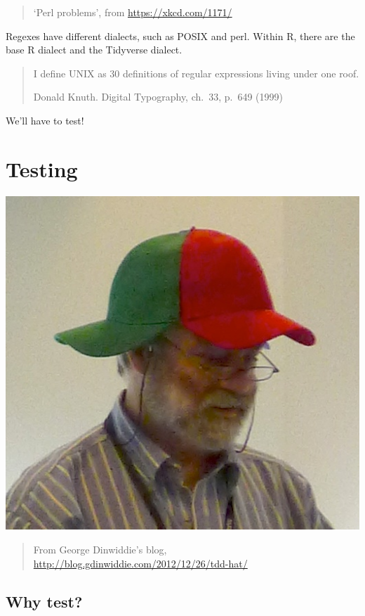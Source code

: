\documentclass[]{book}
\begin{document}
\begin{quote}
`Perl problems', from \url{https://xkcd.com/1171/}
\end{quote}

Regexes have different dialects, such as POSIX and perl.
Within R, there are the base R dialect and the Tidyverse dialect.

\begin{quote}
I define UNIX as 30 definitions of regular expressions living under one roof.

Donald Knuth. Digital Typography, ch.~33, p.~649 (1999)
\end{quote}

We'll have to test!

\hypertarget{testing}{%
\section{Testing}\label{testing}}

\includegraphics{data/06_george_dinwiddie.jpg}

\begin{quote}
From George Dinwiddie's blog, \url{http://blog.gdinwiddie.com/2012/12/26/tdd-hat/}
\end{quote}

\hypertarget{why-test}{%
\subsection{Why test?}\label{why-test}}
\end{document}
